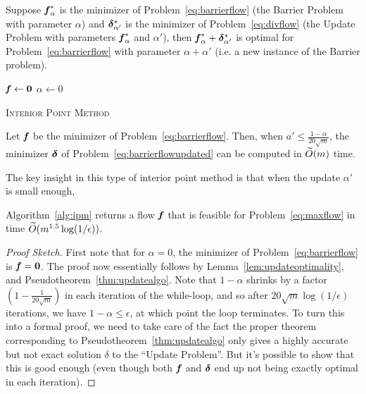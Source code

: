 \begin{lemma}
  \label{lem:updateoptimality}
  Suppose $\boldsymbol{\mathit{f}}^*_{\alpha}$ is the minimizer of Problem~\eqref{eq:barrierflow}
  (the Barrier Problem with parameter $\alpha$) and
  $\boldsymbol{\delta}^*_{\alpha'}$ is the minimizer of Problem~\eqref{eq:divflow} (the
  Update Problem with parameters $\boldsymbol{\mathit{f}}^*_{\alpha}$ and $\alpha'$),
  then $\boldsymbol{\mathit{f}}^*_{\alpha} + \boldsymbol{\delta}^*_{\alpha'}$ is optimal for Problem~\eqref{eq:barrierflow} 
  with parameter $\alpha+\alpha'$ (i.e. a new instance of the Barrier
  problem).
\end{lemma}



\begin{algorithm}[H]
  \SetAlgoLined
  $\boldsymbol{\mathit{f}} \leftarrow \boldsymbol{0}$\;
  $\alpha \leftarrow 0$\;
  \Return{\ff}
  \caption{\textsc{Interior Point Method}}
  \label{alg:ipm}
\end{algorithm}

\begin{pseudotheorem}
  \label{thm:updatealgo}
  Let $\boldsymbol{\mathit{f}}$ be the minimizer of Problem~\eqref{eq:barrierflow}.
  Then, when  $a' \leq \frac{1-\alpha}{20\sqrt{m}}$, the minimizer
  $\boldsymbol{\delta}$ of Problem~\eqref{eq:barrierflowupdated} can be computed
  in $\widetilde{O}(m)$ time.
\end{pseudotheorem}

The key insight in this type of interior point method is that when the
update $\alpha'$ is small enough, 
\begin{theorem}\label{thm:maxflowipm}
  Algorithm~\ref{alg:ipm} returns a flow $\boldsymbol{\mathit{f}}$ that is feasible for
  Problem~\eqref{eq:maxflow} in time $\widetilde{O}(m^{1.5}\log(1/\epsilon))$.
\end{theorem}

\begin{proof}[Proof Sketch]
  First note that for $\alpha = 0$, the minimizer of
  Problem~\eqref{eq:barrierflow} is $\boldsymbol{\mathit{f}} = \boldsymbol{0}$.
  The proof now essentially follows by
  Lemma~\eqref{lem:updateoptimality}, and
  Pseudotheorem~\ref{thm:updatealgo}.
  Note that $1-\alpha$ shrinks by a factor $(1-\frac{1}{20\sqrt{m}})$
    in each iteration of the while-loop, and so after
    $20\sqrt{m}\log(1/\epsilon)$ iterations, we have $1-\alpha \leq
    \epsilon$, at which point the loop terminates.
   To turn this into a formal proof, we need to take care of the fact
   the proper theorem corresponding to 
   Pseudotheorem~\ref{thm:updatealgo} only gives a highly accurate
   but not exact solution $\delta$ to the ``Update Problem''.
   But it's possible to show that this is good enough (even though
   both $\boldsymbol{\mathit{f}}$ and $\boldsymbol{\delta}$ end up not being exactly optimal in each iteration).
\end{proof}


